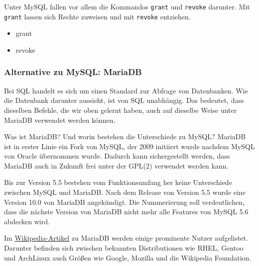 Unter MySQL fallen vor allem die Kommandos \texttt{grant} und \texttt{revoke} darunter. Mit \texttt{grant} lassen sich Rechte zuweisen und mit \texttt{revoke} entziehen.

	\begin{itemize}
		\item grant
		\item revoke
	\end{itemize}

\subsubsection{Alternative zu MySQL: MariaDB}

Bei SQL handelt es sich um einen Standard zur Abfrage von Datenbanken. Wie die Datenbank darunter aussieht, ist von SQL unabhängig. Das bedeutet, dass dieselben Befehle, die wir oben gelernt haben, auch auf dieselbe Weise unter MariaDB verwendet werden können.

Was ist MariaDB? Und worin bestehen die Unterschiede zu MySQL? MariaDB ist in erster Linie ein Fork von MySQL, der 2009 initiiert wurde nachdem MySQL von Oracle übernommen wurde. Dadurch kann sichergestellt werden, dass MariaDB auch in Zukunft frei unter der GPL(2) verwendet werden kann.

Bis zur Version 5.5 bestehen vom Funktionsumfang her keine Unterschiede zwischen MySQL und MariaDB. Nach dem Release von Version 5.5 wurde eine Version 10.0 von MariaDB angekündigt. Die Nummerierung soll verdeutlichen, dass die nächste Version von MariaDB nicht mehr alle Features von MySQL 5.6 abdecken wird.

Im \href{http://en.wikipedia.org/wiki/MariaDB}{Wikipedia-Artikel} zu MariaDB werden einige prominente Nutzer aufgelistet. Darunter befinden sich zwischen bekannten Distributionen wie RHEL, Gentoo und ArchLinux auch Größen wie Google, Mozilla und die Wikipedia Foundation.

